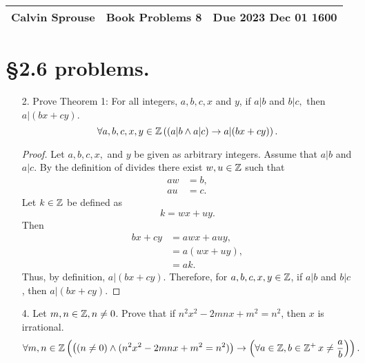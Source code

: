 \documentclass[a4paper, 12pt]{../../config/homework}
\begin{document}
\noindent
\begin{tabularx}{\textwidth}{>{\centering\arraybackslash}X>{\centering\arraybackslash}X>{\centering\arraybackslash}X}
Calvin Sprouse & Book Problems 8 & Due 2023 Dec 01 1600\\\hline
\end{tabularx}

\section*{\S 2.6 problems.}
\begin{enumerate}
\item[2.] Prove Theorem 1: For all integers, $a, b, c, x$ and $y$, if $a|b$ and $b|c,$ then $a|(bx+cy)$.
\[\forall a, b, c, x, y\in\mathbb{Z}\left(\left(a|b\land a|c\right) \rightarrow a|(bx+cy)\right).\]
\begin{proof}
Let $a, b, c, x,$ and $y$ be given as arbitrary integers. Assume that $a|b$ and $a|c$. By the definition of divides there exist $w,u\in\mathbb{Z}$ such that
\begin{align*}
aw &= b,\\
au &= c.
\end{align*}
Let $k\in\mathbb{Z}$ be defined as
\[k=wx+uy.\]
Then
\begin{align*}
    bx+cy &= awx + auy,
    \\&= a(wx+uy),
    \\&= ak.
\end{align*}
Thus, by definition, $a|(bx+cy)$. Therefore, for $a, b, c, x, y\in\mathbb{Z}$, if $a|b$ and $b|c$, then $a|(bx+cy)$.
\end{proof}

\pagebreak
\item[4.] Let $m,n\in\mathbb{Z}, n\neq0$. Prove that if $n^2x^2-2mnx+m^2=n^2$, then $x$ is irrational.
\[\forall m,n\in\mathbb{Z}\left(\left((n\neq0) \land (n^2x^2-2mnx+m^2=n^2)\right) \rightarrow \left(\forall a\in\mathbb{Z},b\in\mathbb{Z}^+\,x\neq\frac{a}{b}\right)\right).\]


\end{enumerate}
\end{document}
